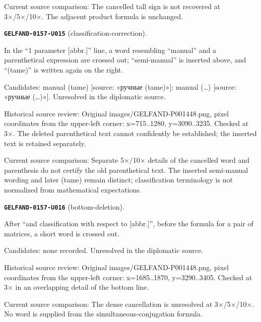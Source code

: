 Current source comparison: The cancelled tall sign is not recovered at 3×/5×/10×. The adjacent product formula is unchanged.\par\medskip
\par\noindent\leavevmode{}\label{GELFAND-0157-U015}\label{GELFAND-P001448:classification-correction}\textbf{\texttt{GELFAND-0157-U015}} (classification-correction).\nopagebreak[4]\par
In the “1 parameter [abbr.]” line, a word resembling “manual” and a parenthetical expression are crossed out; “semi-manual” is inserted above, and “(tame)” is written again on the right.\par
Candidates: manual (tame) [source: «ручные (tame)»]; manual (…) [source: «ручные (…)»]. Unresolved in the diplomatic source.\par
Historical source review: Original images/GELFAND-P001448.png, pixel coordinates from the upper-left corner: x=715..1280, y=3090..3235. Checked at 3×. The deleted parenthetical text cannot confidently be established; the inserted text is retained separately.\par
Current source comparison: Separate 5×/10× details of the cancelled word and parenthesis do not certify the old parenthetical text. The inserted semi-manual wording and later (tame) remain distinct; classification terminology is not normalized from mathematical expectations.\par\medskip
\par\noindent\leavevmode{}\label{GELFAND-0157-U016}\label{GELFAND-P001448:bottom-deletion}\textbf{\texttt{GELFAND-0157-U016}} (bottom-deletion).\nopagebreak[4]\par
After “and classification with respect to [abbr.]”, before the formula for a pair of matrices, a short word is crossed out.\par
Candidates: none recorded. Unresolved in the diplomatic source.\par
Historical source review: Original images/GELFAND-P001448.png, pixel coordinates from the upper-left corner: x=1685..1870, y=3290..3405. Checked at 3× in an overlapping detail of the bottom line.\par
Current source comparison: The dense cancellation is unresolved at 3×/5×/10×. No word is supplied from the simultaneous-conjugation formula.\par\medskip
